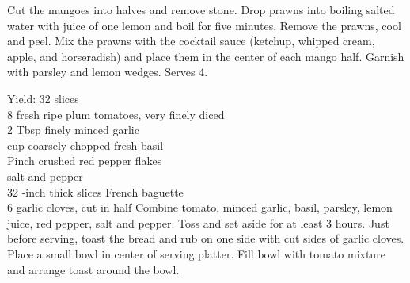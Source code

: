 \begin{minipage}{\linewidth}
\end{minipage}\par\begin{minipage}{\linewidth}  
{Cut the mangoes into halves and remove stone. Drop prawns into boiling salted water with juice of one lemon and boil for five minutes. Remove the prawns, cool and peel. Mix the prawns with the cocktail sauce (ketchup, whipped cream, apple, and horseradish) and place them in the center of each mango half. Garnish with parsley and lemon wedges. Serves 4.}

\end{minipage}\par\begin{minipage}{\linewidth} 
Yield: 32 slices \\
	\step
	{8 fresh ripe plum tomatoes, very finely diced \\
	 2 Tbsp finely minced garlic	\\
	  cup coarsely chopped fresh basil\\
	 Pinch crushed red pepper flakes	\\
	 salt and pepper\\
	 32 -inch thick slices French baguette	\\
	 6 garlic cloves, cut in half
		}{
Combine tomato, minced garlic, basil, parsley, lemon juice, red pepper, salt and pepper. Toss and set aside for at least 3 hours. Just before serving, toast the bread and rub on one side with cut sides of garlic cloves. Place a small bowl in center of serving platter. Fill bowl with tomato mixture and arrange toast around the bowl. }


\end{minipage}
